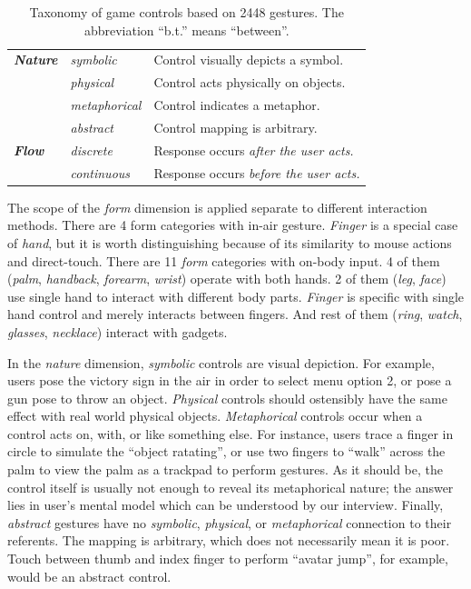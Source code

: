 \documentclass{sigchi}
\begin{document}
\begin{table}
\begin{adjustwidth}{-0.4cm}{}
\begin{tabular}{|l|l|l|}
      \Xhline{4\arrayrulewidth}
        \textbf{\em{Nature}} & \em{symbolic} & Control visually depicts a symbol.\\ \cline{2-3} 
             & \em{physical} & Control acts physically on objects.\\ \cline{2-3} 
             & \em{metaphorical} & Control indicates a metaphor.\\ \cline{2-3} 
             & \em{abstract} & Control mapping is arbitrary.\\
      \Xhline{4\arrayrulewidth}
        \textbf{\em{Flow}} & \em{discrete} & Response occurs \em{after} the user acts.\\ \cline{2-3} 
             & \em{continuous} & Response occurs \em{before} the user acts.\\
      \hline
    \end{tabular}
    \caption{Taxonomy of game controls based on 2448 gestures. The abbreviation ``b.t.'' means ``between''.}
    \label{tab:taxonomy}
    \end{adjustwidth}
  \end{table}

  The scope of the \emph{form} dimension is applied separate to different interaction methods. There are 4 form categories with in-air gesture. \emph{Finger} is a special case of \emph{hand}, but it is worth distinguishing because of its similarity to mouse actions and direct-touch. There are 11 \emph{form} categories with on-body input. 4 of them (\emph{palm}, \emph{handback}, \emph{forearm}, \emph{wrist}) operate with both hands. 2 of them (\emph{leg}, \emph{face}) use single hand to interact with different body parts. \emph{Finger} is specific with single hand control and merely interacts between fingers. And rest of them (\emph{ring}, \emph{watch}, \emph{glasses}, \emph{necklace}) interact with gadgets.


  In the \emph{nature} dimension, \emph{symbolic} controls are visual depiction. For example, users pose the victory sign in the air in order to select menu option 2, or pose a gun pose to throw an object. \emph{Physical} controls should ostensibly have the same effect with real world physical objects. \emph{Metaphorical} controls occur when a control acts on, with, or like something else. For instance, users trace a finger in circle to simulate the ``object ratating'', or use two fingers to ``walk'' across the palm to view the palm as a trackpad to perform gestures. As it should be, the control itself is usually not enough to reveal its metaphorical nature; the answer lies in user's mental model which can be understood by our interview. Finally, \emph{abstract} gestures have no \emph{symbolic}, \emph{physical}, or \emph{metaphorical} connection to their referents. The mapping is arbitrary, which does not necessarily mean it is poor. Touch between thumb and index finger to perform ``avatar jump'', for example, would be an abstract control.
\end{document}
